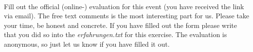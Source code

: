  \\
Fill out the official (online-) evaluation for this event (you have received 
the link via email). The free text comments is the most interesting part for 
us. Please take your time, be honest and concrete. If you have filled out the 
form please write that you did so into the \emph{erfahrungen.txt} for this 
exercise. The evaluation is anonymous, so just let us know if you have filled 
it out.